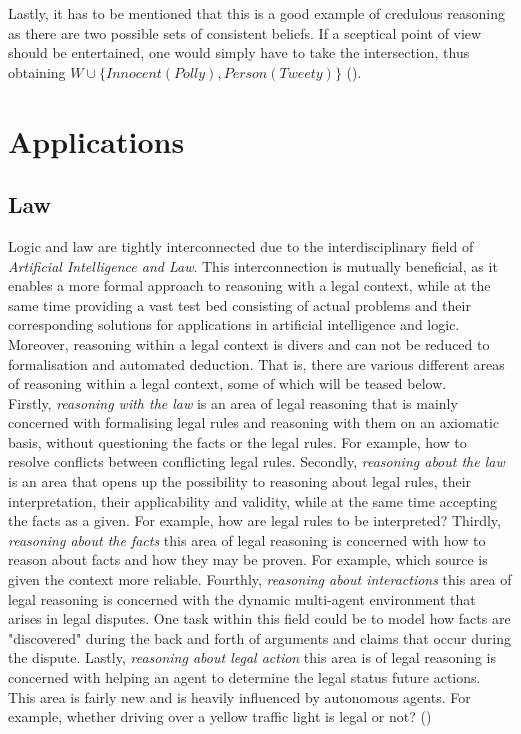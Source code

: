 \documentclass{extarticle}
\begin{document}
Lastly, it has to be mentioned that this is a good example of credulous reasoning as there are two possible sets of consistent beliefs. If a sceptical point of view should be entertained, one would simply have to take the intersection, thus obtaining $W \cup \{Innocent(Polly), Person(Tweety)\}$ (\cite{ANTONIOU2007517,brewka1997nonmonotonic}).

\section{Applications}
\subsection{Law}
Logic and law are tightly interconnected due to the interdisciplinary field of \emph{Artificial Intelligence and Law}. This interconnection is mutually beneficial, as it enables a more formal approach to reasoning with a legal context, while at the same time providing a vast test bed consisting of actual problems and their corresponding solutions for applications in artificial intelligence and logic. Moreover, reasoning within a legal context is divers and can not be reduced to formalisation and automated deduction. That is, there are various different areas of reasoning within a legal context, some of which will be teased below. \\

Firstly, \emph{reasoning with the law} is an area of legal reasoning that is mainly concerned with formalising legal rules and reasoning with them on an axiomatic basis, without questioning the facts or the legal rules. For example, how to resolve conflicts between conflicting legal rules.
Secondly, \emph{reasoning about the law} is an area that opens up the possibility to reasoning about legal rules, their interpretation, their applicability and validity, while at the same time accepting the facts as a given. For example, how are legal rules to be interpreted? 
Thirdly, \emph{reasoning about the facts} this area of legal reasoning is concerned with how to reason about facts and how they may be proven. For example, which source is given the context more reliable.
Fourthly, \emph{reasoning about interactions} this area of legal reasoning is concerned with the dynamic multi-agent environment that arises in legal disputes. One task within this field could be to model how facts are "discovered" during the back and forth of arguments and claims that occur during the dispute. 
Lastly, \emph{reasoning about legal action} this area is of legal reasoning is concerned with helping an agent to determine the legal status future actions. This area is fairly new and is heavily influenced by autonomous agents. For example, whether driving over a yellow traffic light is legal or not? (\cite{prakken2015law, Prakken2017}) \\
\end{document}
